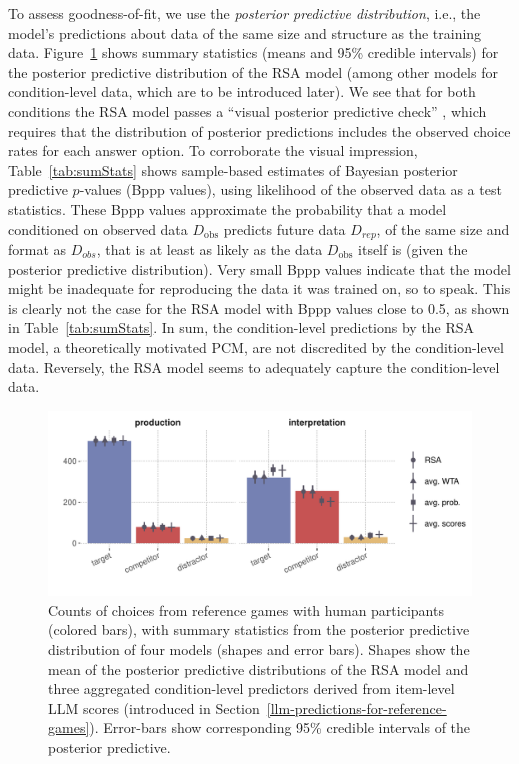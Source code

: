 \documentclass[fleqn]{article}
\begin{document}
To assess goodness-of-fit, we use the \emph{posterior predictive distribution}, i.e., the model's predictions about data of the same size and structure as the training data.
Figure~\ref{fig:refgame-counts} shows summary statistics (means and 95\% credible intervals) for the posterior predictive distribution of the RSA model (among other models for condition-level data, which are to be introduced later).
We see that for both conditions the RSA model passes a ``visual posterior predictive check'' \citep{Kruschke2011:Doing-Bayesian-}, which requires that the distribution of posterior predictions includes the observed choice rates for each answer option.
To corroborate the visual impression, Table~\ref{tab:sumStats} shows sample-based estimates of Bayesian posterior predictive $p$-values (Bppp values), using likelihood of the observed data as a test statistics.
These Bppp values approximate the probability that a model conditioned on observed data $D_{\text{obs}}$ predicts future data $D_{rep}$, of the same size and format as $D_{obs}$, that is at least as likely as the data $D_{\text{obs}}$ itself is (given the posterior predictive distribution).
Very small Bppp values indicate that the model might be inadequate for reproducing the data it was trained on, so to speak.
This is clearly not the case for the RSA model with Bppp values close to 0.5, as shown in Table~\ref{tab:sumStats}.
In sum, the condition-level predictions by the RSA model, a theoretically motivated PCM, are not discredited by the condition-level data.
Reversely, the RSA model seems to adequately capture the condition-level data.

\begin{figure}[t]
  \centering

    \includegraphics[width=0.9\linewidth]{00-pics/GPT-PPC-alpha-eps-model.pdf}

    \caption{
      Counts of choices from reference games with human participants (colored bars), with summary statistics from the posterior predictive distribution of four models (shapes and error bars).
      Shapes show the mean of the posterior predictive distributions of the RSA model and three aggregated condition-level predictors derived from item-level LLM scores (introduced in Section~\ref{llm-predictions-for-reference-games}).
      Error-bars show corresponding 95\% credible intervals of the posterior predictive.
    }
  \label{fig:refgame-counts}
\end{figure}
\end{document}
